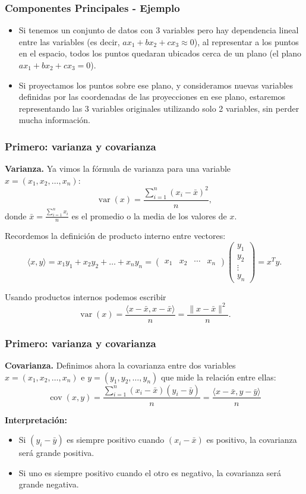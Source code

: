 \documentclass[aspectratio=169,12pt]{beamer}
\DeclareMathOperator{\var}{var}
\DeclareMathOperator{\cov}{cov}
\begin{document}
\begin{frame}
    \frametitle{Componentes Principales - Ejemplo}
    \begin{itemize}
    \item Si tenemos un conjunto de datos con 3 variables pero hay dependencia lineal entre las variables (es decir, $a x_1 + b x_2 + c x_3 \approx 0$), al representar a los puntos en el espacio, todos los puntos quedaran ubicados cerca de un plano (el plano $a x_1 + b x_2 + c x_3 = 0$).
    \item Si proyectamos los puntos sobre ese plano, y consideramos nuevas variables definidas por las coordenadas de las proyecciones en ese plano, estaremos representando las 3 variables originales utilizando solo 2 variables, sin perder mucha información.
    \end{itemize}

\end{frame}


\begin{frame}
\frametitle{Primero: varianza y covarianza}

\textbf{Varianza.} Ya vimos la f\'ormula de varianza para una variable $x = (x_1, x_2, \dots, x_n)$:
$$
\var(x) = \frac{\sum_{i=1}^n(x_i - \bar x)^2}{n},
$$
donde $\bar x = \frac{\sum_{i = 1}^n x_i}{n}$ es el promedio o la media de los valores de $x$.

Recordemos la definición de producto interno entre vectores:
{\scriptsize
$$\langle x, y\rangle = x_1 y_1 + x_2 y_2 + \dots + x_n y_n = \begin{pmatrix} x_1 & x_2 & \cdots & x_n \end{pmatrix} \begin{pmatrix} y_1 \\ y_2 \\ \vdots \\ y_n \end{pmatrix} = x^T y.$$}

Usando productos internos podemos escribir
$$
\var(x) = \frac{\langle x - \bar x,  x - \bar x \rangle}{n} = \frac{\| x - \bar x\|^2}{n}.
$$


\end{frame}


\begin{frame}
\frametitle{Primero: varianza y covarianza}

\textbf{Covarianza.} Definimos ahora la covarianza entre dos variables $x = (x_1, x_2, \dots, x_n)$ e $y = (y_1, y_2, \dots, y_n)$ que mide la relaci\'on entre ellas:
$$
\cov(x,y) = \frac{\sum_{i = 1}^n (x_i - \bar x)(y_i - \bar y)}{n}= \frac{\langle x - \bar x , y - \bar y \rangle}{n}
$$

\textbf{Interpretaci\'on:}
\begin{itemize}
\item Si $(y_i - \bar y)$ es siempre positivo cuando $(x_i - \bar x)$ es positivo, la covarianza será grande positiva.
\item Si uno es siempre positivo cuando el otro es negativo, la covarianza será grande negativa.
\end{itemize}

\end{frame}
\end{document}
